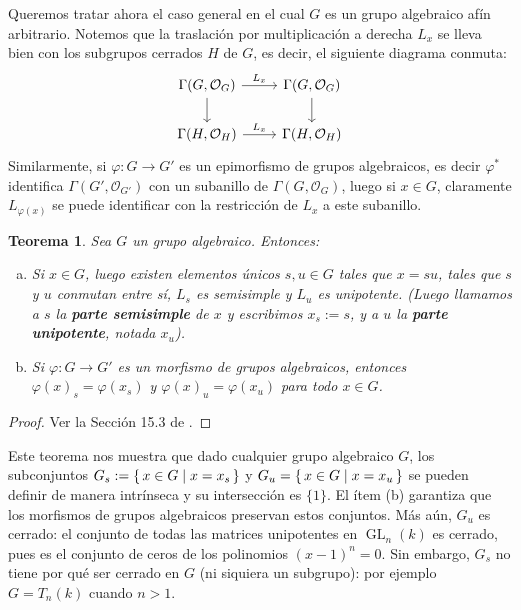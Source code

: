 \documentclass[spanish,10pt]{amsart}
\newtheorem{theorem}{Teorema}[section]
\theoremstyle{definition}
\theoremstyle{remark}
\numberwithin{equation}{section}
\renewcommand{\O}{\mathcal{O}}
\begin{document}
\bigskip

Queremos tratar ahora el caso general en el cual $G$ es un grupo algebraico afín arbitrario. Notemos que la traslación por multiplicación a derecha $L_x$ se lleva bien con los subgrupos cerrados $H$ de $G$, es decir, el siguiente diagrama conmuta:
\[
    \begin{tikzcd}
    \Gamma (G, \O_G) \arrow{r}{L_x} \arrow[d] & \Gamma (G, \O_G) \arrow[d] \\
    \Gamma (H, \O_H) \arrow{r}{L_x} & \Gamma (H, \O_H)
    \end{tikzcd}
\]
Similarmente, si $\varphi : G \to G'$ es un epimorfismo de grupos algebraicos, es decir $\varphi^*$ identifica $\Gamma (G', \O_{G'})$ con un subanillo de $\Gamma (G, \O_G)$, luego si $x \in G$, claramente $L_{\varphi (x)}$ se puede identificar con la restricción de $L_x$ a este subanillo.

\begin{theorem}
Sea $G$ un grupo algebraico. Entonces:
\begin{enumerate}[(a)]
\item Si $x \in G$, luego existen elementos únicos $s,u \in G$ tales que $x = su$, tales que $s$ y $u$ conmutan entre sí, $L_s$ es semisimple y $L_u$ es unipotente. (Luego llamamos a $s$ la \textbf{parte semisimple} de $x$ y escribimos $x_s := s$, y a $u$ la \textbf{parte unipotente}, notada $x_u$).
\item Si $\varphi : G \to G'$ es un morfismo de grupos algebraicos, entonces $\varphi (x)_s = \varphi (x_s)$ y $\varphi (x)_u = \varphi (x_u)$ para todo $x \in G$.
\end{enumerate}
\end{theorem}
\begin{proof}
Ver la Sección 15.3 de \cite{humphreys2012linearAlgebraicGroups}.
\end{proof}

Este teorema nos muestra que dado cualquier grupo algebraico $G$, los subconjuntos $G_s := \set{x \in G | x = x_s}$ y $G_u = \set{x \in G | x = x_u}$ se pueden definir de manera intrínseca y su intersección es $\{1\}$. El ítem (b) garantiza que los morfismos de grupos algebraicos preservan estos conjuntos. Más aún, $G_u$ es cerrado: el conjunto de todas las matrices unipotentes en $\operatorname{GL}_n (k)$ es cerrado, pues es el conjunto de ceros de los polinomios $(x-1)^n = 0$. Sin embargo, $G_s$ no tiene por qué ser cerrado en $G$ (ni siquiera un subgrupo): por ejemplo $G = T_n (k)$ cuando $n > 1$.
\end{document}
